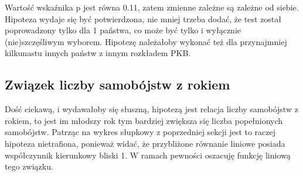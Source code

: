\documentclass[11pt]{article}
\begin{document}
    Wartość wskaźnika p jest równa 0.11, zatem zmienne zależne są zależne od
siebie. Hipoteza wydaje się być potwierdzona, nie mniej trzeba dodać, że
test został poprowadzony tylko dla 1 państwa, co może być tylko i
wyłącznie (nie)szczęśliwym wyborem. Hipotezę należałoby wykonać też dla
przynajmniej kilkunastu innych państw z innym rozkładem PKB.

    \hypertarget{zwiux105zek-liczby-samobuxf3jstw-z-rokiem}{%
\subsection{Związek liczby samobójstw z
rokiem}\label{zwiux105zek-liczby-samobuxf3jstw-z-rokiem}}

Dość ciekawą, i wydawałoby się słuszną, hipotezą jest relacja liczby
samobójstw z rokiem, to jest im młodszy rok tym bardziej zwiększa się
liczba popełnionych samobójstw. Patrząc na wykres słupkowy z poprzedniej
sekcji jest to raczej hipoteza nietrafiona, ponieważ widać, że
przybliżone równanie liniowe posiada współczynnik kierunkowy bliski 1. W
ramach pewności oszacuję funkcję liniową tego związku.
\end{document}
